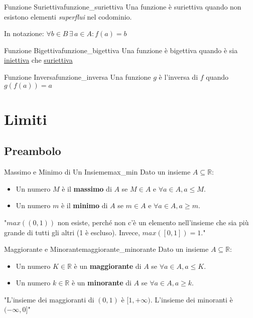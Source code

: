 \documentclass{article}
\begin{document}
\begin{definition}{Funzione Suriettiva}{funzione_suriettiva}
    Una funzione è suriettiva quando non esistono elementi \textit{superflui} nel codominio.

    In notazione: $ \forall b \in B \, \exists \, a \in A: f(a) = b $
\end{definition}

\begin{definition}{Funzione Bigettiva}{funzione_bigettiva}
    Una funzione è bigettiva quando è sia \hyperref[def:funzione_iniettiva]{iniettiva} che \hyperref[def:funzione_suriettiva]{suriettiva}
\end{definition}

\begin{definition}{Funzione Inversa}{funzione_inversa}
    Una funzione $g$ è l'inversa di $f$ quando $g(f(a)) = a$
\end{definition}

\section{Limiti}

\subsection{Preambolo}

\begin{definition}{Massimo e Minimo di Un Insieme}{max_min}
    Dato un insieme $A \subseteq \mathbb{R}$:
    \begin{itemize}
        \item Un numero $M$ è il \textbf{massimo} di $A$ se $M \in A$ e $\forall a \in A, a \le M$.
        \item Un numero $m$ è il \textbf{minimo} di $A$ se $m \in A$ e $\forall a \in A, a \ge m$.
    \end{itemize}
    "$max((0,1))$ non esiste, perché non c'è un elemento nell'insieme che sia più grande di tutti gli altri (1 è escluso). Invece, $max([0,1]) = 1$."
\end{definition}

\begin{definition}{Maggiorante e Minorante}{maggiorante_minorante}
    Dato un insieme $A \subseteq \mathbb{R}$:
    \begin{itemize}
        \item Un numero $K \in \mathbb{R}$ è un \textbf{maggiorante} di $A$ se $\forall a \in A, a \le K$.
        \item Un numero $k \in \mathbb{R}$ è un \textbf{minorante} di $A$ se $\forall a \in A, a \ge k$.
    \end{itemize}
    "L'insieme dei maggioranti di $(0,1)$ è $[1, +\infty)$. L'insieme dei minoranti è $(-\infty, 0]$"
\end{definition}
\end{document}
